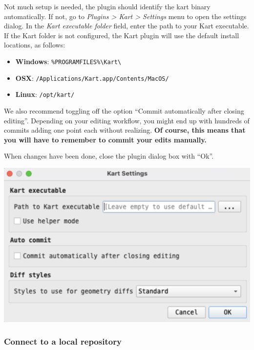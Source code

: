 \documentclass[
  letterpaper,
  DIV=11,
  numbers=noendperiod]{scrartcl}
\begin{document}
Not much setup is needed, the plugin should identify the kart binary
automatically. If not, go to \emph{Plugins \textgreater{} Kart
\textgreater{} Settings} menu to open the settings dialog. In the
\emph{Kart executable folder} field, enter the path to your Kart
executable. If the Kart folder is not configured, the Kart plugin will
use the default install locations, as follows:

\begin{itemize}
\item
  \textbf{Windows}:
  \texttt{\%PROGRAMFILES\%\textbackslash{}Kart\textbackslash{}}
\item
  \textbf{OSX}: \texttt{/Applications/Kart.app/Contents/MacOS/}
\item
  \textbf{Linux}: \texttt{/opt/kart/}
\end{itemize}

We also recommend toggling off the option ``Commit automatically after
closing editing''. Depending on your editing workflow, you might end up
with hundreds of commits adding one point each without realizing.
\textbf{Of course, this means that you will have to remember to commit
your edits manually.}

When changes have been done, close the plugin dialog box with ``Ok''.

\begin{center}
\includegraphics{img/kart-settings.png}
\end{center}

\subsubsection{Connect to a local
repository}\label{connect-to-a-local-repository}
\end{document}

